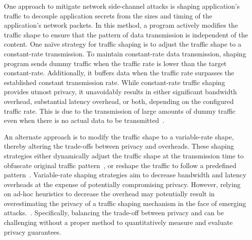 One approach to mitigate network side-channel attacks is shaping application's traffic to decouple application secrets from the sizes and timing of the application's network packets.
In this method, a program actively modifies the traffic shape to ensure that the pattern of data transmission is independent of the content.  
One na\"ive strategy for traffic shaping is to adjust the traffic shape to a constant-rate transmission.
To maintain constant-rate data transmission, shaping program sends dummy traffic when the traffic rate is lower than the target constant-rate. Additionally, it buffers data when the traffic rate surpasses the established constant transmission rate.
While constant-rate traffic shaping provides utmost privacy, it unavoidably results in either significant bandwidth overhead, substantial latency overhead, or both, depending on the configured traffic rate.
This is due to the transmission of large amounts of dummy traffic even when there is no actual data to be transmitted~\cite{saponas2007devices}.

An alternate approach is to modify the traffic shape to a variable-rate shape, thereby altering the trade-offs between privacy and overheads.
These shaping strategies either dynamically adjust the traffic shape at the transmission time to obfuscate original traffic pattern~\cite{cai2014csbuflo, juarez2016wtfpad}, or reshape the traffic to follow a predefined pattern~\cite{wright2009traffic,wang2017walkie}.
Variable-rate shaping strategies aim to decrease bandwidth and latency overheads at the expense of potentially compromising privacy.
However, relying on ad-hoc heuristics to decrease the overhead may potentially result in overestimating the privacy of a traffic shaping mechanism in the face of emerging attacks.~\cite{sirinam2018df}. 
Specifically, balancing  the trade-off between privacy and  can be challenging without a proper method to quantitatively measure and evaluate privacy guarantees. 

